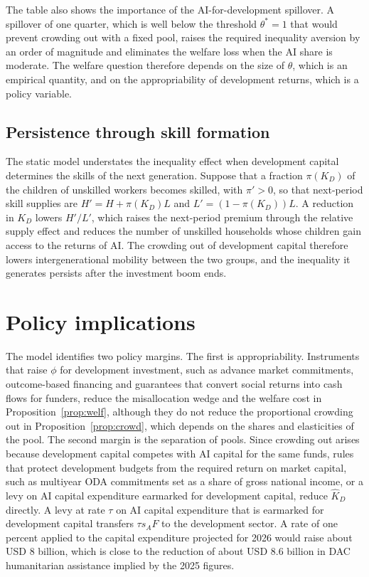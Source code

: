 \documentclass[AER]{AEA}
\newcommand{\sA}{s_A}
\begin{document}
The table also shows the importance of the AI-for-development spillover. A spillover of one quarter, which is well below the threshold $\theta^{*}=1$ that would prevent crowding out with a fixed pool, raises the required inequality aversion by an order of magnitude and eliminates the welfare loss when the AI share is moderate. The welfare question therefore depends on the size of $\theta$, which is an empirical quantity, and on the appropriability of development returns, which is a policy variable.

\subsection{Persistence through skill formation}

The static model understates the inequality effect when development capital determines the skills of the next generation. Suppose that a fraction $\pi(K_D)$ of the children of unskilled workers becomes skilled, with $\pi'>0$, so that next-period skill supplies are $H'=H+\pi(K_D)L$ and $L'=(1-\pi(K_D))L$. A reduction in $K_D$ lowers $H'/L'$, which raises the next-period premium through the relative supply effect and reduces the number of unskilled households whose children gain access to the returns of AI. The crowding out of development capital therefore lowers intergenerational mobility between the two groups, and the inequality it generates persists after the investment boom ends.

\section{Policy implications}

The model identifies two policy margins. The first is appropriability. Instruments that raise $\phi$ for development investment, such as advance market commitments, outcome-based financing and guarantees that convert social returns into cash flows for funders, reduce the misallocation wedge and the welfare cost in Proposition~\ref{prop:welf}, although they do not reduce the proportional crowding out in Proposition~\ref{prop:crowd}, which depends on the shares and elasticities of the pool. The second margin is the separation of pools. Since crowding out arises because development capital competes with AI capital for the same funds, rules that protect development budgets from the required return on market capital, such as multiyear ODA commitments set as a share of gross national income, or a levy on AI capital expenditure earmarked for development capital, reduce $\hat{K}_D$ directly. A levy at rate $\tau$ on AI capital expenditure that is earmarked for development capital transfers $\tau\sA F$ to the development sector. A rate of one percent applied to the capital expenditure projected for 2026 would raise about USD 8 billion, which is close to the reduction of about USD 8.6 billion in DAC humanitarian assistance implied by the 2025 figures.
\end{document}
